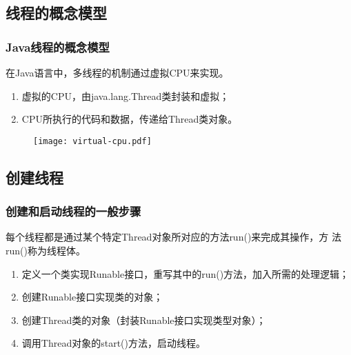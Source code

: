 \subsection{线程的概念模型}

\begin{frame}[fragile] %
\frametitle{Java线程的概念模型}

在Java语言中，多线程的机制通过{\hei 虚拟CPU}来实现。

\begin{enumerate}\kai
\item 虚拟的CPU，由java.lang.Thread类封装和虚拟；
\item CPU所执行的代码和数据，传递给Thread类对象。
\end{enumerate}
\begin{figure}
\centering
\texttt{[image: virtual-cpu.pdf]}
\end{figure}
\end{frame}

\subsection{创建线程}

\begin{frame}[fragile] %
  \frametitle{创建和启动线程的一般步骤}

  每个线程都是通过某个特定Thread对象所对应的方法run()来完成其操作，方
  法run()称为{\hei\Red 线程体}。
  
  \begin{enumerate}[<+-|alert@+>]\kai
  \item 定义一个类实现Runable接口，重写其中的run()方法，加入所需的处理逻辑；
  \item 创建Runable接口实现类的对象；
  \item 创建Thread类的对象（封装Runable接口实现类型对象）；
  \item 调用Thread对象的start()方法，启动线程。
  \end{enumerate}

\end{frame}



